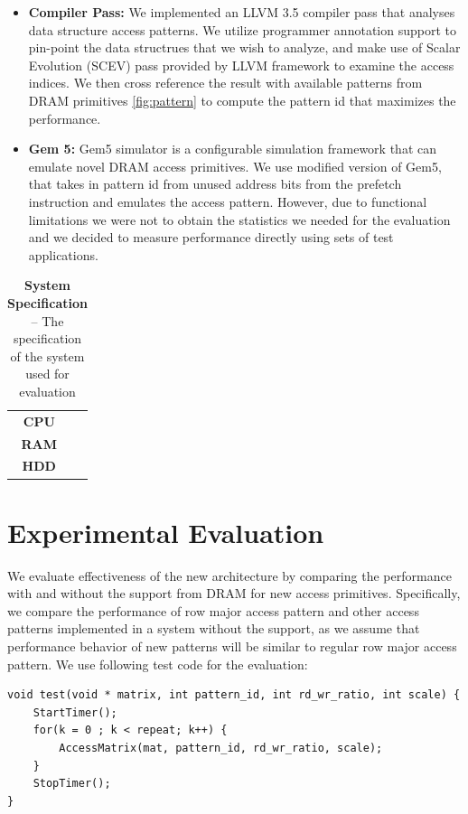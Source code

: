 \documentclass[letterpaper]{article}
\begin{document}
\begin{itemize}

  \item \textbf{Compiler Pass:} We implemented an LLVM 3.5 compiler pass that analyses data structure access patterns. We utilize programmer annotation support to pin-point the data structrues that we wish to analyze, and make use of Scalar Evolution (SCEV) pass provided by LLVM framework to examine the access indices. We then cross reference the result with available patterns from DRAM primitives \ref{fig:pattern} to compute the pattern id that maximizes the performance.
  \item \textbf{Gem 5:} Gem5 simulator is a configurable simulation framework that can emulate novel DRAM access primitives. We use modified version of Gem5, that takes in pattern id from unused address bits from the prefetch instruction and emulates the access pattern. However, due to functional limitations we were not to obtain the statistics we needed for the evaluation and we decided to measure performance directly using sets of test applications.
\end{itemize}

\begin{table}[t]
    \centering
    \begin{tabular}{c|c}
  \textbf{CPU} & \\
    \textbf{RAM} & \\
    \textbf{HDD} & \\

  \end{tabular}
    \caption{
        \textbf{System Specification} --
        The specification of the system used for evaluation
    }
    \label{tab:spec}
\end{table}

\section{Experimental Evaluation}

We evaluate effectiveness of the new architecture by comparing the performance with and without
the support from DRAM for new access primitives. Specifically, we compare the performance
of row major access pattern and other access patterns implemented in a system without the support,
as we assume that performance behavior of new patterns will be similar to regular row major
access pattern. We use following test code for the evaluation:

\begin{Verbatim}[fontsize=\small]
void test(void * matrix, int pattern_id, int rd_wr_ratio, int scale) {
    StartTimer();
    for(k = 0 ; k < repeat; k++) {
        AccessMatrix(mat, pattern_id, rd_wr_ratio, scale);
    }
    StopTimer();
}
\end{Verbatim}
\end{document}
